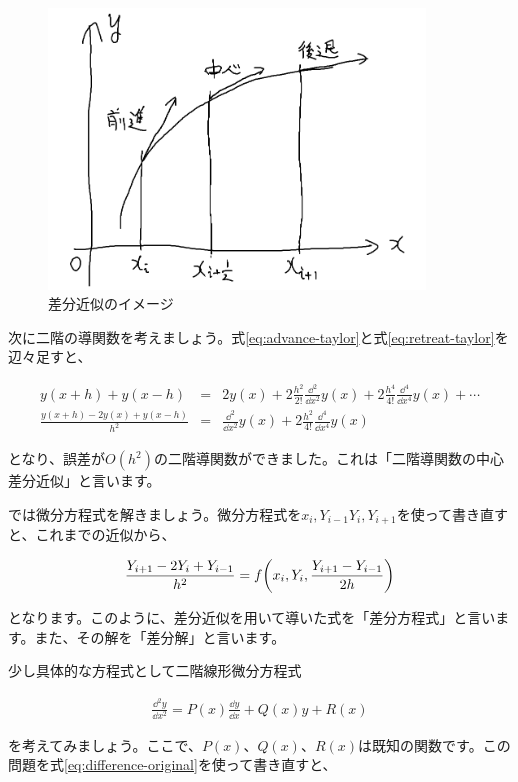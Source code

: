 \begin{figure}[ht!]
  \centering
  \includegraphics[width=10cm]{img/4-difference.png}
  \caption{差分近似のイメージ}
  \label{fig:4-difference}
\end{figure}

次に二階の導関数を考えましょう。式\ref{eq:advance-taylor}と式\ref{eq:retreat-taylor}を辺々足すと、

\begin{eqnarray}
    y(x+h)+y(x-h)&=&2y(x)+2\frac{h^2}{2!}\frac{\dd^2}{\dd x^2}y(x)+2\frac{h^4}{4!}\frac{\dd^4}{\dd x^4}y(x)+\cdots \\
    \frac{y(x+h)-2y(x)+y(x-h)}{h^2}&=&\frac{\dd^2}{\dd x^2}y(x)+2\frac{h^2}{4!}\frac{\dd^4}{\dd x^4}y(x)
\end{eqnarray}

\noindent
となり、誤差が$O(h^2)$の二階導関数ができました。これは「二階導関数の中心差分近似」と言います。

では微分方程式を解きましょう。微分方程式を$x_i,Y_{i-1}Y_i,Y_{i+1}$を使って書き直すと、これまでの近似から、

\begin{eqnarray}
    \frac{Y_{i+1}-2Y_i+Y_{i-1}}{h^2}=f\pqty{x_i,Y_i,\frac{Y_{i+1}-Y_{i-1}}{2h}}
    \label{eq:difference-original}
\end{eqnarray}

\noindent
となります。このように、差分近似を用いて導いた式を「差分方程式」と言います。また、その解を「差分解」と言います。

少し具体的な方程式として二階線形微分方程式

\begin{eqnarray}
    \frac{\dd^2 y}{\dd x^2}=P(x)\frac{\dd y}{\dd x}+Q(x)y+R(x)
\end{eqnarray}

\noindent
を考えてみましょう。ここで、$P(x)$、$Q(x)$、$R(x)$は既知の関数です。この問題を式\ref{eq:difference-original}を使って書き直すと、

